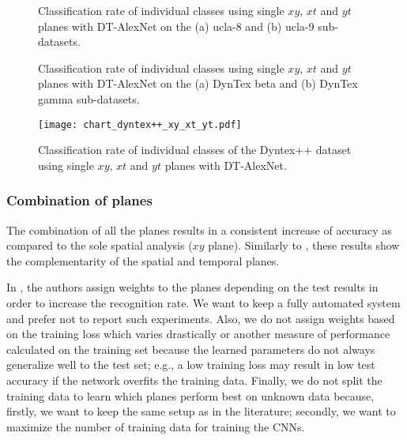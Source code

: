 \documentclass[a4paper,11pt]{article}
\begin{document}
\begin{figure}[!t]
\centerline{
\hfil
{}}
\caption{Classification rate of individual classes using single $xy$, $xt$ and $yt$ planes with DT-AlexNet on the (a) ucla-8 and (b) ucla-9 sub-datasets.}
\label{fig:misclass_gamma}
\end{figure}
\begin{figure}[!t]
\centerline{
\hfil
{}}
\caption{Classification rate of individual classes using single $xy$, $xt$ and $yt$ planes with DT-AlexNet on the (a) DynTex beta and (b) DynTex gamma sub-datasets.}
\label{fig:misclass_gamma}
\end{figure}
\begin{figure}[!t]
\centering
\texttt{[image: chart\_dyntex++\_xy\_xt\_yt.pdf]}
  \caption{Classification rate of individual classes of the Dyntex++ dataset using single $xy$, $xt$ and $yt$ planes with DT-AlexNet.}\label{fig:chart_dyntex++_xy_xt_yt}
\end{figure}

\subsubsection{Combination of planes}\leavevmode \par
The combination of all the planes results in a consistent increase of accuracy as compared to the sole spatial analysis ($xy$ plane).
Similarly to \cite{zhao2007dynamic}, these results show the complementarity of the spatial and temporal planes.

In \cite{zhao2007dynamic}, the authors assign weights to the planes depending on the test results in order to increase the recognition rate.
We want to keep a fully automated system and prefer not to report such experiments. 
Also, we do not assign weights based on the training loss which varies drastically or another measure of performance calculated on the training set because the learned parameters do not always generalize well to the test set; e.g., a low training loss may result in low test accuracy if the network overfits the training data.
Finally, we do not split the training data to learn which planes perform best on unknown data because, firstly, we want to keep the same setup as in the literature; secondly, we want to maximize the number of training data for training the CNNs.
\end{document}
